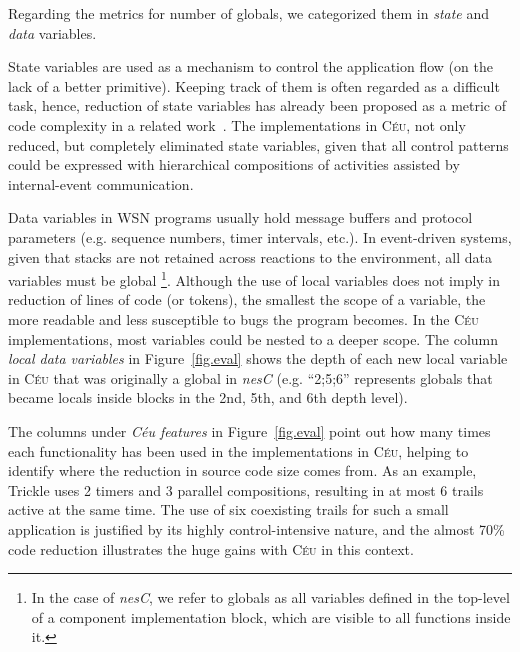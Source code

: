 \documentclass[letterpaper]{sig-alternate}
\newcommand{\code}[1] {{\small{\texttt{#1}}}}
\newcommand{\CEU}{\textsc{C\'{e}u}\xspace}
\begin{document}
Regarding the metrics for number of globals, we categorized them in 
\emph{state} and \emph{data} variables.

State variables are used as a mechanism to control the application flow (on the 
lack of a better primitive).
Keeping track of them is often regarded as a difficult task, hence, reduction 
of state variables has already been proposed as a metric of code complexity in 
a related work~\cite{wsn.protothreads}.
The implementations in \CEU, not only reduced, but completely eliminated state 
variables, given that all control patterns could be expressed with hierarchical 
compositions of activities assisted by internal-event communication.

Data variables in WSN programs usually hold message buffers and protocol 
parameters (e.g. sequence numbers, timer intervals, etc.).
In event-driven systems, given that stacks are not retained across reactions to 
the environment, all data variables must be global%
\footnote{In the case of \emph{nesC}, we refer to globals as all variables 
defined in the top-level of a component implementation block, which are visible 
to all functions inside it.}.
Although the use of local variables does not imply in reduction of lines of 
code (or tokens), the smallest the scope of a variable, the more readable and 
less susceptible to bugs the program becomes.
%
In the \CEU implementations, most variables could be nested to a deeper scope.
The column \emph{local data variables} in Figure~\ref{fig.eval} shows the depth 
of each new local variable in \CEU that was originally a global in \emph{nesC} 
(e.g. ``2;5;6'' represents globals that became locals inside blocks in the 2nd, 
5th, and 6th depth level).

The columns under \emph{C\'eu features} in Figure~\ref{fig.eval} point out how 
many times each functionality has been used in the implementations in \CEU, 
helping to identify where the reduction in source code size comes from.
%
As an example, Trickle uses 2 timers and 3 parallel compositions, resulting in 
at most 6 trails active at the same time.
The use of six coexisting trails for such a small application is justified by 
its highly control-intensive nature, and the almost 70\% code reduction 
illustrates the huge gains with \CEU in this context.
%


\newpage %
\end{document}
